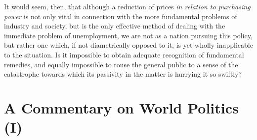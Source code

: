 \documentclass{book}
\begin{document}
It would seem, then, that although a reduction of prices \emph{in relation to purchasing power} is not only vital in connection with the more fundamental problems of industry and society, but is the only effective method of dealing with the immediate problem of unemployment, we are not as a nation pursuing this policy, but rather one which, if not diametrically opposed to it, is yet wholly inapplicable to the situation. Is it impossible to obtain adequate recognition of fundamental remedies, and equally impossible to rouse the general public to a sense of the catastrophe towards which its passivity in the matter is hurrying it so swiftly?

\chapter{A Commentary on World Politics (I)}
\label{chapter-9}
\end{document}
